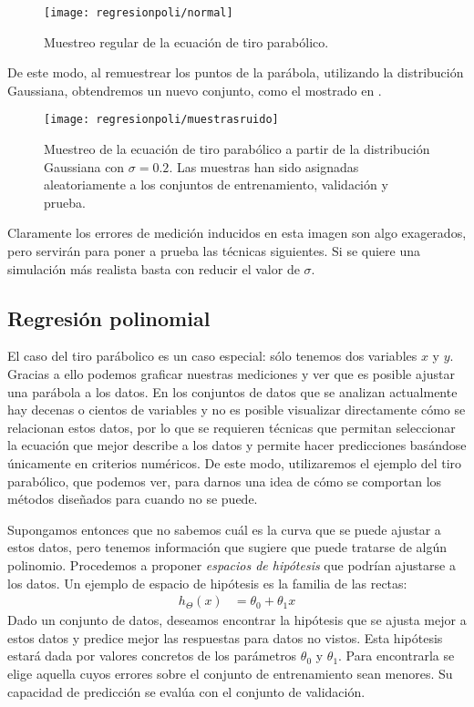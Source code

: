 \begin{figure}
 \centering
 \texttt{[image: regresionpoli/normal]}
 \caption{Muestreo regular de la ecuación de tiro parabólico.}\label{fig:campana}
\end{figure}

De este modo, al remuestrear los puntos de la parábola, utilizando la distribución Gaussiana, obtendremos un nuevo conjunto, como el mostrado en .
\begin{figure}
 \centering
 \texttt{[image: regresionpoli/muestrasruido]}
 \caption{Muestreo de la ecuación de tiro parabólico a partir de la distribución Gaussiana con $\sigma=0.2$.  Las muestras han sido asignadas aleatoriamente a los conjuntos de entrenamiento, validación y prueba.}\label{fig:muestrasruido}
\end{figure}
Claramente los errores de medición inducidos en esta imagen son algo exagerados, pero servirán para poner a prueba las técnicas siguientes.  Si se quiere una simulación más realista basta con reducir el valor de $\sigma$.



\subsection{Regresión polinomial}

El caso del tiro parábolico es un caso especial: sólo tenemos dos variables $x$ y $y$.  Gracias a ello podemos graficar nuestras mediciones y ver que es posible ajustar una parábola a los datos.  En los conjuntos de datos que se analizan actualmente hay decenas o cientos de variables y no es posible visualizar directamente cómo se relacionan estos datos, por lo que se requieren técnicas que permitan seleccionar la ecuación que mejor describe a los datos y permite hacer predicciones basándose únicamente en criterios numéricos.  De este modo, utilizaremos el ejemplo del tiro parabólico, que podemos ver, para darnos una idea de cómo se comportan los métodos diseñados para cuando no se puede.

Supongamos entonces que no sabemos cuál es la curva que se puede ajustar a estos datos, pero tenemos información que sugiere que puede tratarse de algún polinomio.  Procedemos a proponer \emph{espacios de hipótesis} que podrían ajustarse a los datos.  Un ejemplo de espacio de hipótesis es la familia de las rectas:
\begin{align*}
h_{\Theta}(x) &= \theta_0 + \theta_1 x
\end{align*}
Dado un conjunto de datos, deseamos encontrar la hipótesis que se ajusta mejor a estos datos y predice mejor las respuestas para datos no vistos.  Esta hipótesis estará dada por valores concretos de los parámetros $\theta_0$ y $\theta_1$.  Para encontrarla se elige aquella cuyos errores sobre el conjunto de entrenamiento sean menores.  Su capacidad de predicción se evalúa con el conjunto de validación.

